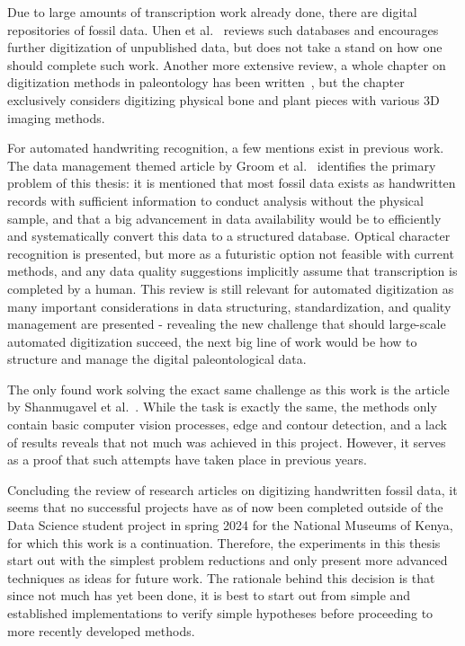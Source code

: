 \documentclass[english,twoside,openright]{UH_DS_MSc}
\begin{document}
Due to large amounts of transcription work already done, there are digital repositories of fossil data.
Uhen et al.~\cite{uhenCardCatalogsComputers2013} reviews such databases and encourages further 
digitization of unpublished data, but does not take a stand on how one should complete such work.
Another more extensive review, a whole chapter on digitization methods in paleontology has been written~\cite{mallisonDigitizingMethodsPaleontology2011},
but the chapter exclusively considers digitizing physical bone and plant pieces with various 3D imaging methods.

For automated handwriting recognition, a few mentions exist in previous work. The data management themed 
article by Groom et al.~\cite{groomImprovedStandardizationTranscribed2019} identifies the primary 
problem of this thesis: it is mentioned that most fossil data exists as handwritten records with sufficient information 
to conduct analysis without the physical sample, and that a big advancement in data availability would be to efficiently and 
systematically convert this data to a structured database. Optical character recognition is presented, but more as a futuristic option 
not feasible with current methods, and any data quality suggestions implicitly assume that transcription is completed 
by a human. This review is still relevant for automated digitization as many important considerations in data structuring,
standardization, and quality management are presented - revealing the new challenge that should large-scale automated digitization succeed,
the next big line of work would be how to structure and manage the digital paleontological data.

The only found work solving the exact same challenge as this work is the article by Shanmugavel et al.~\cite{shanmugavelHandwrittenOpticalCharacter2018}.
While the task is exactly the same, the methods only contain basic computer 
vision processes, edge and contour detection, and a lack of results reveals that not much was achieved in 
this project. However, it serves as a proof that such attempts have taken place in previous years.

Concluding the review of research articles on digitizing handwritten fossil data, it seems that no successful projects
have as of now been completed outside of the Data Science student project in spring 2024 for the National 
Museums of Kenya, for which this work is a continuation. Therefore, the experiments in this thesis
start out with the simplest problem reductions and only present more advanced techniques as ideas for future work.
The rationale behind this decision is that since not much has yet been done, it is best to start out from 
simple and established implementations to verify simple hypotheses before proceeding to more recently developed methods.
\end{document}
